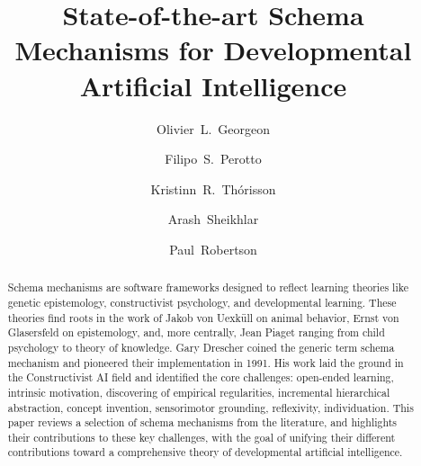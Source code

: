 \documentclass[runningheads]{llncs}
\begin{document}
%
\title{State-of-the-art Schema Mechanisms for Developmental Artificial Intelligence}
%
%
\author{Olivier~L.~Georgeon \and
Filipo~S.~Perotto \and
Kristinn~R.~Th{\'o}risson  \and
Arash~Sheikhlar \and
Paul~Robertson
}
%
%
%
\maketitle              %
%
\begin{abstract}
Schema mechanisms are software frameworks designed to reflect learning theories like 
genetic epistemology, 
constructivist psychology, %
and developmental learning.  
These theories find roots in the work of Jakob von Uexküll on animal behavior, Ernst von Glasersfeld on epistemology, and, more centrally, Jean Piaget ranging from child psychology to theory of knowledge.
Gary Drescher coined the generic term schema mechanism and pioneered their implementation in 1991.
His work laid the ground in the Constructivist AI field and identified the core challenges: open-ended learning, intrinsic motivation, discovering of empirical regularities, incremental hierarchical abstraction, concept invention, sensorimotor grounding, reflexivity, individuation. 
This paper reviews a selection of 
schema mechanisms from the literature,
and highlights their contributions to these key challenges, with the goal of unifying their different contributions toward a comprehensive theory of developmental artificial intelligence.

\end{abstract}
%
%
\end{document}
